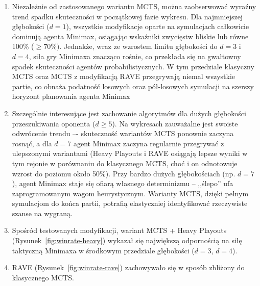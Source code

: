 \documentclass{article}
\begin{document}
\begin{enumerate}
    \item Niezależnie od zastosowanego wariantu MCTS, można zaobserwować wyraźny trend spadku skuteczności w początkowej fazie wykresu. Dla najmniejszej głębokości ($d=1$), wszystkie modyfikacje oparte na symulacjach całkowicie dominują agenta Minimax, osiągając wskaźniki zwycięstw bliskie lub równe 100\% ($\geq 70\%)$. Jednakże, wraz ze wzrostem limitu głębokości do $d=3$ i $d=4$, siła gry Minimaxa znacząco rośnie, co przekłada się na gwałtowny spadek skuteczności agentów probabilistycznych. W tym przedziale klasyczny MCTS oraz MCTS z modyfikacją RAVE przegrywają niemal wszystkie partie, co obnaża podatność losowych oraz pół-losowych symulacji na szerszy horyzont planowania agenta Minimax
    \item Szczególnie interesujące jest zachowanie algorytmów dla dużych głębokości przeszukiwania oponenta ($d \geq 5$). Na wykresach zauważalne jest swoiste odwrócenie trendu –- skuteczność wariantów MCTS ponownie zaczyna rosnąć, a dla $d=7$ agent Minimax zaczyna regularnie przegrywać z ulepszonymi wariantami (Heavy Playouts i RAVE osiągają lepsze wyniki w tym rejonie w porównaniu do klasycznego MCTS, choć i on odnotowuje wzrost do poziomu około 50\%). Przy bardzo dużych głębokościach (np. $d=7$), agent Minimax staje się ofiarą własnego determinizmu -- ,,ślepo'' ufa zaprogramowanym wagom heurystycznym. Warianty MCTS, dzięki pełnym symulacjom do końca partii, potrafią elastyczniej identyfikować rzeczywiste szanse na wygraną.
    \item Spośród testowanych modyfikacji, wariant MCTS + Heavy Playouts (Rysunek~\ref{fig:winrate-heavy}) wykazał się największą odpornością na siłę taktyczną Minimaxa w środkowym przedziale głębokości ($d=3$, $d=4$).
    \item RAVE (Rysunek~\ref{fig:winrate-rave}) zachowywało się w sposób zbliżony do klasycznego MCTS.
\end{enumerate}
\end{document}
